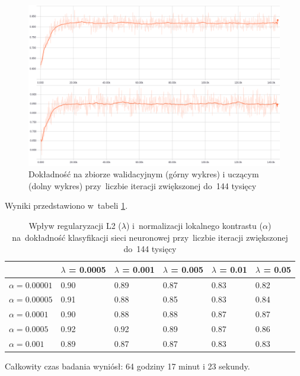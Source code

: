 \begin{figure}[H]
	\centering
	\includegraphics[width=\linewidth]{img/badanie_2.png}
	\caption{Dokładność na zbiorze walidacyjnym (górny wykres) i uczącym (dolny wykres) przy~liczbie iteracji
	         zwiększonej do~144 tysięcy}
	\label{rys:badanie-2}
\end{figure}

Wyniki przedstawiono w~tabeli \ref{table:wyniki2}.

\begin{table}[H]
    \centering
    \begin{tabular}{|l|l|l|l|l|l|}
      \hline
                       & $\lambda$ = 0.0005 & $\lambda$ = 0.001 & $\lambda$ = 0.005 & $\lambda$ = 0.01 & $\lambda$ = 0.05 \\
      \hline
      $\alpha=0.00001$ & 0.90 & 0.89 & 0.87 & 0.83 & 0.82 \\
      \hline
      $\alpha=0.00005$ & 0.91 & 0.88 & 0.85 & 0.83 & 0.84 \\
      \hline
      $\alpha=0.0001$  & 0.90 & 0.88 & 0.88 & 0.87 & 0.87 \\
      \hline
      $\alpha=0.0005$  & 0.92 & 0.92 & 0.89 & 0.87 & 0.86 \\
      \hline
      $\alpha=0.001$   & 0.89 & 0.87 & 0.87 & 0.83 & 0.83 \\
      \hline
    \end{tabular}
    \caption{Wpływ regularyzacji L2 ($\lambda$) i~normalizacji lokalnego kontrastu ($\alpha$) na~dokładność klasyfikacji
    sieci neuronowej przy~liczbie iteracji zwiększonej do~144 tysięcy}
    \label{table:wyniki2}
\end{table}

Całkowity czas badania wyniósł: 64 godziny 17 minut i 23 sekundy.


